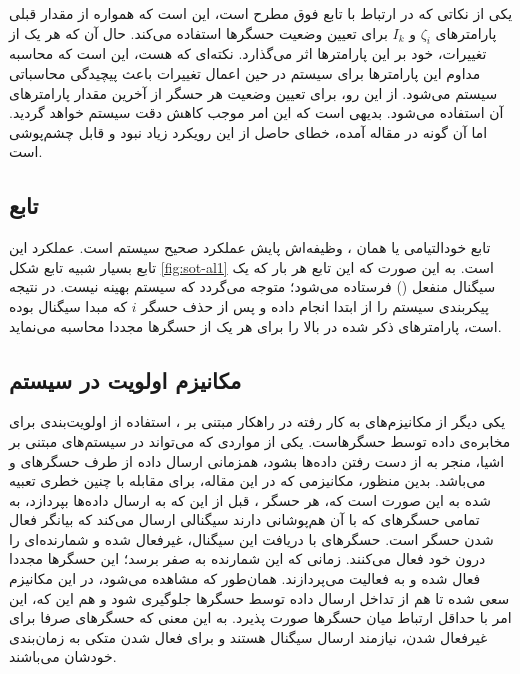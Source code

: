 \par
یکی از نکاتی که در ارتباط با تابع فوق مطرح است، این است که همواره از مقدار قبلی پارامتر‌های $\zeta_i$ و $I_k$ برای تعیین وضعیت حسگرها استفاده می‌کند. حال آن که هر یک از تغییرات، خود بر این پارامترها اثر می‌گذارد. نکته‌ای که هست، این است که محاسبه مداوم این پارامترها برای سیستم در حین اعمال تغییرات باعث پیچیدگی محاسباتی سیستم می‌شود. از این رو، برای تعیین وضعیت هر حسگر از آخرین مقدار پارامترهای آن استفاده می‌شود. بدیهی است که این امر موجب کاهش دقت سیستم خواهد گردید. اما آن گونه در مقاله آمده، خطای حاصل از این رویکرد زیاد نبود و قابل چشم‌پوشی است.

\subsection{تابع }
تابع خودالتیامی یا همان ، وظیفه‌اش پایش عملکرد صحیح سیستم است. عملکرد این تابع بسیار شبیه تابع شکل \ref{fig:sot-al1} است. به این صورت که این تابع هر بار که یک سیگنال منفعل () فرستاده می‌شود؛ متوجه می‌گردد که سیستم بهینه نیست. در نتیجه پیکربندی سیستم را از ابتدا انجام داده و پس از حذف حسگر $i$ که مبدا سیگنال  بوده است، پارامترهای ذکر شده در بالا را برای هر یک از حسگرها مجددا محاسبه می‌نماید.

\subsection{مکانیزم اولویت در سیستم }
یکی دیگر از مکانیزم‌های به کار رفته در راهکار مبتنی بر ، استفاده از اولویت‌بندی برای مخابره‌ی داده توسط حسگرهاست. یکی از مواردی که می‌تواند در سیستم‌های مبتنی بر اشیا، منجر به از دست رفتن داده‌ها بشود، همزمانی ارسال داده از طرف حسگرهای  و  می‌باشد. بدین منظور، مکانیزمی که در این مقاله، برای  مقابله با چنین خطری تعبیه شده به این صورت است که، هر حسگر ، قبل از این که به ارسال داده‌ها بپردازد، به تمامی حسگرهای  که با آن هم‌پوشانی دارند سیگنالی ارسال می‌کند که بیانگر فعال شدن حسگر  است. حسگرهای  با دریافت این سیگنال، غیرفعال شده و شمارنده‌ای را درون خود فعال می‌کنند. زمانی که این شمارنده به صفر برسد؛ این حسگرها مجددا فعال شده و به فعالیت می‌پردازند. همان‌طور که مشاهده می‌شود، در این مکانیزم سعی شده تا هم از تداخل ارسال داده توسط حسگرها جلوگیری شود و هم این که، این امر با حداقل ارتباط میان حسگرها صورت پذیرد. به این معنی که حسگرهای  صرفا برای غیرفعال شدن، نیازمند ارسال سیگنال هستند و برای فعال شدن متکی به زمان‌بندی خودشان می‌باشند.

